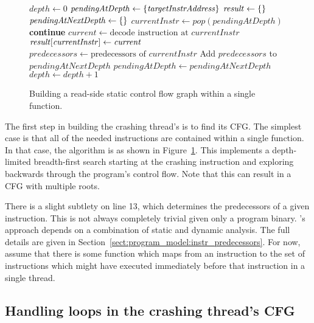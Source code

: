 \begin{figure}
\begin{algorithmic}[1]
\State $\mathit{depth} \gets 0$
\State $\mathit{pendingAtDepth} \gets \{\mathit{targetInstrAddress}\}$
\State $\mathit{result} \gets \{\}$
  \State $\mathit{pendingAtNextDepth} \gets \{\}$
    \State $\mathit{currentInstr} \gets \mathit{pop}(\mathit{pendingAtDepth})$
      \State \textbf{continue}
    \EndIf
    \State $\mathit{current} \gets \text{decode instruction at } \mathit{currentInstr}$
    \State $\mathit{result}[\mathit{currentInstr}] \gets \mathit{current}$
    \State $\mathit{predecessors} \gets \text{predecessors of } \mathit{currentInstr}$
    \State Add $\mathit{predecessors}$ to $\mathit{pendingAtNextDepth}$
  \EndWhile
  \State $\mathit{pendingAtDepth} \gets \mathit{pendingAtNextDepth}$
  \State $\mathit{depth} \gets \mathit{depth} + 1$
\EndWhile
\end{algorithmic}
\caption{Building a read-side static control flow graph within a
  single function.}
\label{fig:derive:static_read_cfg_single_function}
\end{figure}

The first step in building the crashing thread's {\StateMachine} is to
find its CFG.  The simplest case is that all of the needed
instructions are contained within a single function.  In that case,
the algorithm is as shown in
Figure~\ref{fig:derive:static_read_cfg_single_function}.  This
implements a depth-limited breadth-first search starting at the
crashing instruction and exploring backwards through the program's
control flow.  Note that this can result in a CFG with multiple roots.

There is a slight subtlety on line 13, which determines the
predecessors of a given instruction.  This is not always completely
trivial given only a program binary.  {\Technique}'s approach depends
on a combination of static and dynamic analysis.  The full details are
given in Section~\ref{sect:program_model:instr_predecessors}.  For
now, assume that there is some function which maps from an instruction
to the set of instructions which might have executed immediately
before that instruction in a single thread.

\subsection{Handling loops in the crashing thread's CFG}
\label{sect:derive:handling_loops}


